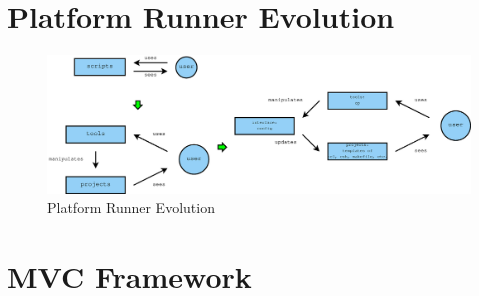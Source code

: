 \documentclass{beamer}
\begin{document}
\section{Platform Runner Evolution} %

\begin{frame}
  \begin{figure}
    \centering
    \includegraphics[width=1.05\linewidth]{mvc_evo}
    \caption{Platform Runner Evolution}
  \end{figure}
\end{frame}

\section{MVC Framework} %
\end{document}

